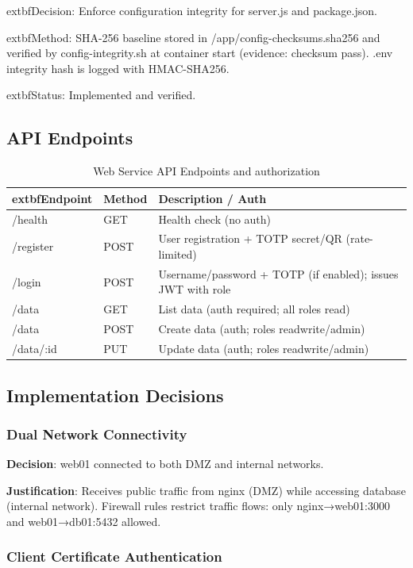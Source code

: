  extbf{Decision}: Enforce configuration integrity for server.js and package.json.

  extbf{Method}: SHA-256 baseline stored in /app/config-checksums.sha256 and verified by config-integrity.sh at container start (evidence: checksum pass). .env integrity hash is logged with HMAC-SHA256.

  extbf{Status}: Implemented and verified.

\subsection{API Endpoints}

\begin{table}[H]
\centering
\begin{tabular}{|l|l|p{7cm}|}
\hline
	extbf{Endpoint} & \textbf{Method} & \textbf{Description / Auth} \\
\hline
/health & GET & Health check (no auth) \\
/register & POST & User registration + TOTP secret/QR (rate-limited) \\
/login & POST & Username/password + TOTP (if enabled); issues JWT with role \\
/data & GET & List data (auth required; all roles read) \\
/data & POST & Create data (auth; roles readwrite/admin) \\
/data/:id & PUT & Update data (auth; roles readwrite/admin) \\
\hline
\end{tabular}
\caption{Web Service API Endpoints and authorization}
\end{table}

\subsection{Implementation Decisions}

\subsubsection{Dual Network Connectivity}

\textbf{Decision}: web01 connected to both DMZ and internal networks.

\textbf{Justification}: Receives public traffic from nginx (DMZ) while accessing database (internal network). Firewall rules restrict traffic flows: only nginx→web01:3000 and web01→db01:5432 allowed.

\subsubsection{Client Certificate Authentication}

